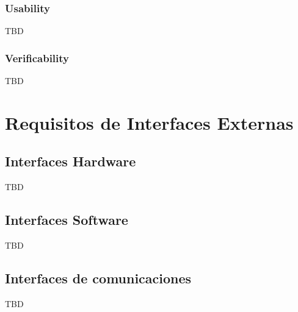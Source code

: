         \subsubsection{Usability}
            TBD
        \subsubsection{Verificability}
            TBD

\section{Requisitos de Interfaces Externas}

    \subsection{Interfaces Hardware}
        TBD
    
    \subsection{Interfaces Software}
        TBD
    
    \subsection{Interfaces de comunicaciones}
        TBD


